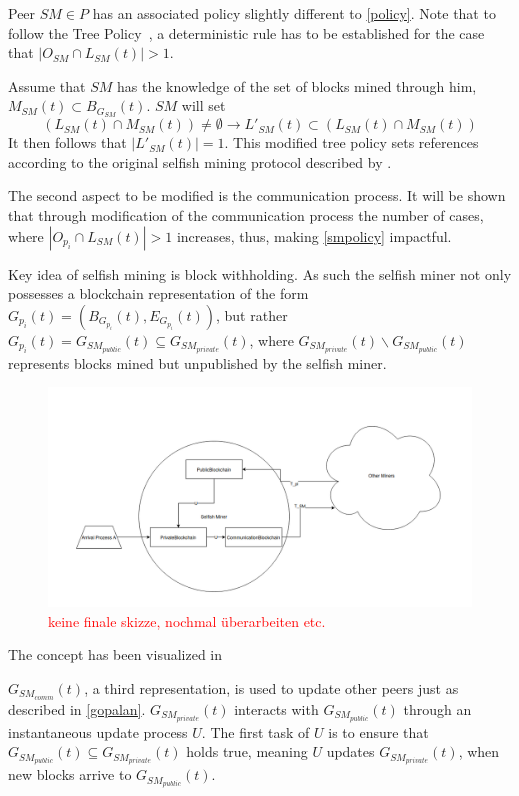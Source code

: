 Peer $SM \in P$ has an associated policy slightly different to \ref{policy}. Note that to follow the Tree Policy~\citep{gopalan}, a deterministic rule has to be established for the case that $|O_{SM} \cap L_{SM}(t)| > 1$.

Assume that $SM$ has the knowledge of the set of blocks mined through him, $M_{SM}(t) \subset B_{G_{SM}}(t)$. $SM$ will set 
\begin{equation}
(L_{SM}(t) \cap M_{SM}(t)) \neq \emptyset \rightarrow L'_{SM}(t) \subset ( L_{SM}(t) \cap M_{SM}(t)) 
\label{smpolicy}
\end{equation}
It then follows that $|L'_{SM}(t)|=1$.
This modified tree policy sets references according to the original selfish mining protocol described by \citeauthor{eyal}.

The second aspect to be modified is the communication process. It will be shown that through modification of the communication process the number of cases, where $|O_{p_i} \cap L_{SM}(t)| > 1$ increases, thus, making \ref{smpolicy} impactful.

Key idea of selfish mining is block withholding. As such the selfish miner not only possesses a blockchain representation of the form $G_{p_i}(t) = (B_{G_{p_i}}(t),E_{G_{p_i}}(t))$, but rather $G_{p_i}(t) = G_{SM_{public}}(t)\subseteq G_{SM_{private}}(t)$, where $G_{SM_{private}}(t)\backslash G_{SM_{public}}(t)$ represents blocks mined but unpublished by the selfish miner.

\begin{figure}
\includegraphics[width=\linewidth]{figures/model_vis1.png}
\caption{\textcolor{red}{keine finale skizze, nochmal überarbeiten etc.}}
\label{fig:model_vis}
\end{figure}

The concept has been visualized in 

$G_{SM_{comm}}(t)$, a third representation, is used to update other peers just as described in \ref{gopalan}. $G_{SM_{private}}(t)$ interacts with $G_{SM_{public}}(t)$ through an instantaneous update process $U$.
The first task of $U$ is to ensure that $G_{SM_{public}}(t)\subseteq G_{SM_{private}}(t)$ holds true, meaning $U$ updates $G_{SM_{private}}(t)$, when new blocks arrive to $G_{SM_{public}}(t)$.

